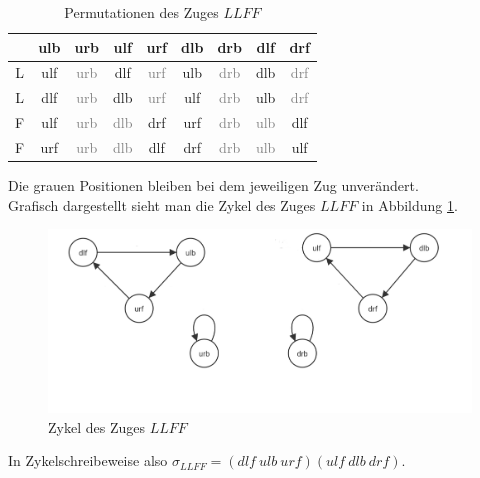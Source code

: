 \documentclass[12pt,a4paper, usenames, dvipsnames]{article}
\begin{document}
\begin{table}[H]
\centering
\begin{tabular}{ccccccccc}

\qquad \qquad & ulb & urb & ulf & urf & dlb & drb & dlf & drf \\
\hline

L & ulf & \textcolor{gray}{urb} & dlf & \textcolor{gray}{urf} & ulb & \textcolor{gray}{drb} & dlb & \textcolor{gray}{drf} \\

L & dlf & \textcolor{gray}{urb} & dlb & \textcolor{gray}{urf} & ulf & \textcolor{gray}{drb} & ulb & \textcolor{gray}{drf} \\

F & ulf & \textcolor{gray}{urb} & \textcolor{gray}{dlb} & drf & urf & \textcolor{gray}{drb} & \textcolor{gray}{ulb} & dlf \\

F & urf & \textcolor{gray}{urb} & \textcolor{gray}{dlb} & dlf & drf & \textcolor{gray}{drb} & \textcolor{gray}{ulb} & ulf \\


\end{tabular}
\caption[Permutationen des Zuges $LLFF$]{Permutationen des Zuges $LLFF$}
\end{table}

Die grauen Positionen bleiben bei dem jeweiligen Zug unverändert. \\

Grafisch dargestellt sieht man die Zykel des Zuges $LLFF$ in Abbildung \ref{17}. 


\begin{figure}[h]
\includegraphics[scale=0.3]{zykel_LLFF.png}
\caption[Zykel des Zuges $LLFF$]{Zykel des Zuges $LLFF$}
\label{17}
\end{figure}

In Zykelschreibeweise also $\sigma_{LLFF}=(dlf \ ulb \ urf)(ulf \ dlb \ drf)$.
\end{document}
